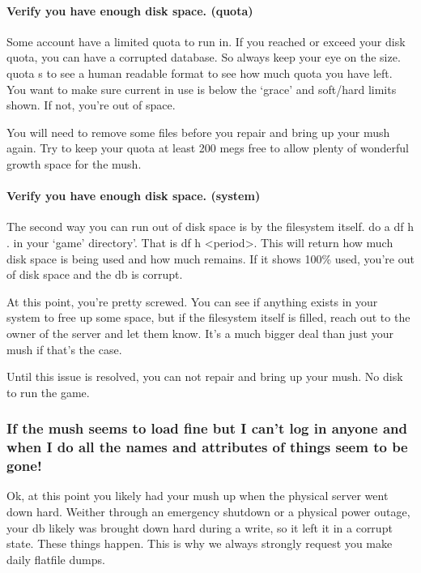 \documentclass[letterpaper,10pt,english]{sphinxmanual}
\begin{document}
\paragraph{Verify you have enough disk space. (quota)}
\label{\detokenize{troubleshooting:verify-you-have-enough-disk-space-quota}}
\sphinxAtStartPar
Some account have a limited quota to run in.  If you reached or exceed
your disk quota, you can have a corrupted database.  So always keep
your eye on the size.  quota \sphinxhyphen{}s to see a human readable format to see
how much quota you have left.  You want to make sure current in use is
below the ‘grace’ and soft/hard limits shown.  If not, you’re out of
space.

\sphinxAtStartPar
You will need to remove some files before you repair and bring up your
mush again.  Try to keep your quota at least 200 megs free to allow
plenty of wonderful growth space for the mush.


\paragraph{Verify you have enough disk space.  (system)}
\label{\detokenize{troubleshooting:verify-you-have-enough-disk-space-system}}
\sphinxAtStartPar
The second way you can run out of disk space is by the filesystem itself.
do a df \sphinxhyphen{}h . in your ‘game’ directory’.  That is df \sphinxhyphen{}h \textless{}period\textgreater{}.
This will return how much disk space is being used and how much remains.
If it shows 100\% used, you’re out of disk space and the db is corrupt.

\sphinxAtStartPar
At this point, you’re pretty screwed.  You can see if anything exists
in your system to free up some space, but if the filesystem itself
is filled, reach out to the owner of the server and let them know.
It’s a much bigger deal than just your mush if that’s the case.

\sphinxAtStartPar
Until this issue is resolved, you can not repair and bring up your mush.
No disk to run the game.


\subsubsection{If the mush seems to load fine but I can’t log in anyone and when I do all the names and attributes of things seem to be gone!}
\label{\detokenize{troubleshooting:if-the-mush-seems-to-load-fine-but-i-can-t-log-in-anyone-and-when-i-do-all-the-names-and-attributes-of-things-seem-to-be-gone}}
\sphinxAtStartPar
Ok, at this point you likely had your mush up when the physical server
went down hard.  Weither through an emergency shutdown or a physical
power outage, your db likely was brought down hard during a write,
so it left it in a corrupt state.  These things happen.  This is
why we always strongly request you make daily flatfile dumps.
\end{document}
